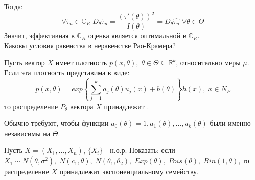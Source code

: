 Тогда:
$$\forall \tilde{\tau_n} \in \mathbb{C}_R \; D_{\theta} \tilde{\tau_n} = \frac{\left( \tau'(\theta) \right)^2}{I(\theta)} = D_{\theta} \hat{\tau_n} \; \forall \theta \in \Theta$$
Значит, эффективная в $\mathbb{C}_R$ оценка является оптимальной в $\mathbb{C}_R$.\\

Каковы условия равенства в неравенстве Рао-Крамера?

\begin{definition}\label{lec:4/def:7}
	Пусть вектор $X$ имеет плотность $p(x, \theta), \; \theta \in \Theta \subseteq \mathbb{R}^k$, относительно меры $\mu$. Если эта плотность представима в виде:
	$$p(x, \theta) = exp \left\{ \underset{j=1}{\overset{k}{\sum}} a_j (\theta) u_j (x) + b(\theta) \right\} \overline{h}(x), \; x \in N_P$$
	то распределение $P_{\theta}$ вектора $X$ принадлежит .
\end{definition}

Обычно требуют, чтобы функции $a_0 (\theta) = 1, a_1 (\theta), \dots, a_k(\theta)$ были именно независимы на $\Theta$.

\begin{problem}
	Пусть $X = (X_1, \dots, X_n)$, $\{X_i\}$ - н.о.р. Показать: если $X_1 \sim N(\theta, \sigma^2), \; N(c_1, \theta), \; N(\theta_1, \theta_2), \; Exp(\theta), \; Pois (\theta), \; Bin(1, \theta)$, то распределение $X$ принадлежит экспоненциальному семейству.
\end{problem}

